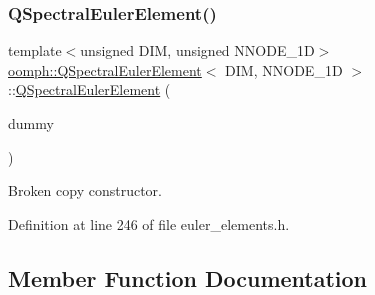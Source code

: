 \subsubsection{\texorpdfstring{Q\+Spectral\+Euler\+Element()}{QSpectralEulerElement()}\hspace{0.1cm}{\footnotesize\ttfamily [2/2]}}
{\footnotesize\ttfamily template$<$unsigned D\+IM, unsigned N\+N\+O\+D\+E\+\_\+1D$>$ \\
\hyperlink{classoomph_1_1QSpectralEulerElement}{oomph\+::\+Q\+Spectral\+Euler\+Element}$<$ D\+IM, N\+N\+O\+D\+E\+\_\+1D $>$\+::\hyperlink{classoomph_1_1QSpectralEulerElement}{Q\+Spectral\+Euler\+Element} (\begin{DoxyParamCaption}\item[{const \hyperlink{classoomph_1_1QSpectralEulerElement}{Q\+Spectral\+Euler\+Element}$<$ D\+IM, N\+N\+O\+D\+E\+\_\+1D $>$ \&}]{dummy }\end{DoxyParamCaption})\hspace{0.3cm}{\ttfamily [inline]}}



Broken copy constructor. 



Definition at line 246 of file euler\+\_\+elements.\+h.



\subsection{Member Function Documentation}
\mbox{\label{classoomph_1_1QSpectralEulerElement_a1aea03c046d9d1bec4717182386d7860}} 

